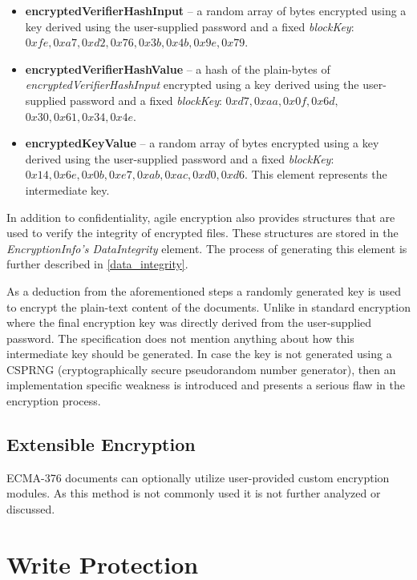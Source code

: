 \documentclass[11pt,oneside]{fithesis2}
\begin{document}
\begin{itemize}
\setlength\itemsep{0.1em}
	\item{\textbf{encryptedVerifierHashInput} -- a random array of bytes encrypted using a key derived using the user-supplied password and a fixed \textit{blockKey}: $0xfe, 0xa7, 0xd2, 0x76, 0x3b, 0x4b, 0x9e, 0x79$.} 
	\item{\textbf{encryptedVerifierHashValue} -- a hash of the plain-bytes of \textit{encryptedVerifierHashInput} encrypted using a key derived using the user-supplied password and a fixed \textit{blockKey}: $0xd7, 0xaa, 0x0f, 0x6d,$ $0x30, 0x61, 0x34, 0x4e$.}
	\item{\textbf{encryptedKeyValue} -- a random array of bytes encrypted using a key derived using the user-supplied password and a fixed \textit{blockKey}: $0x14, 0x6e, 0x0b, 0xe7, 0xab, 0xac, 0xd0, 0xd6$. This element represents the intermediate key.}
\end{itemize}

In addition to confidentiality, agile encryption also provides structures that are used to verify the integrity of encrypted files. These structures are stored in the \textit{EncryptionInfo's DataIntegrity} element. The process of generating this element is further described in \ref{data_integrity}. 

As a deduction from the aforementioned steps a randomly generated key is used to encrypt the plain-text content of the documents. Unlike in standard encryption where the final encryption key was directly derived from the user-supplied password. The specification does not mention anything about how this intermediate key should be generated. In case the key is not generated using a CSPRNG (cryptographically secure pseudorandom number generator), then an implementation specific weakness is introduced and presents a serious flaw in the encryption process. 

\subsection{Extensible Encryption} 

ECMA-376 documents can optionally utilize user-provided custom encryption modules. As this method is not commonly used it is not further analyzed or discussed.  

\section{Write Protection}
\end{document}
